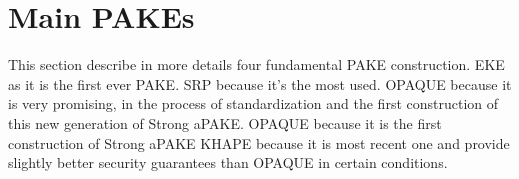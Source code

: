 ﻿\documentclass[../report.tex]{subfiles}
\begin{document}
% 

\section{Main PAKEs}
This section describe in more details four fundamental PAKE construction. 
EKE as it is the first ever PAKE. 
SRP because it's the most used. 
OPAQUE because it is very promising, in the process of standardization and the first construction of this new generation of Strong aPAKE.
OPAQUE because it is the first construction of Strong aPAKE
KHAPE because it is most recent one and provide slightly better security guarantees than OPAQUE in certain conditions.
\end{document}
